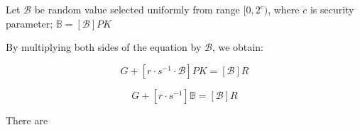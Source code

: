 \documentclass{iacrtrans}
\begin{document}
Let $\mathcal{B}$ be random value selected uniformly from range $[0, 2^c)$, where $c$ is security parameter; 
$\mathbb{B} = [\mathcal{B}] PK$

By multiplying both sides of the equation by $\mathcal{B}$, we obtain:

\begin{equation}
  [m \cdot s^{-1} \cdot \mathcal{B}] G + [r \cdot s^{-1} \cdot \mathcal{B}] PK = [\mathcal{B}]R
\end{equation}

\begin{equation}
  [m \cdot s^{-1} \cdot \mathcal{B}] G + [r \cdot s^{-1}] \mathbb{B} = [\mathcal{B}]R
\end{equation}

There are 



\setcounter{tocdepth}{2}
\end{document}
